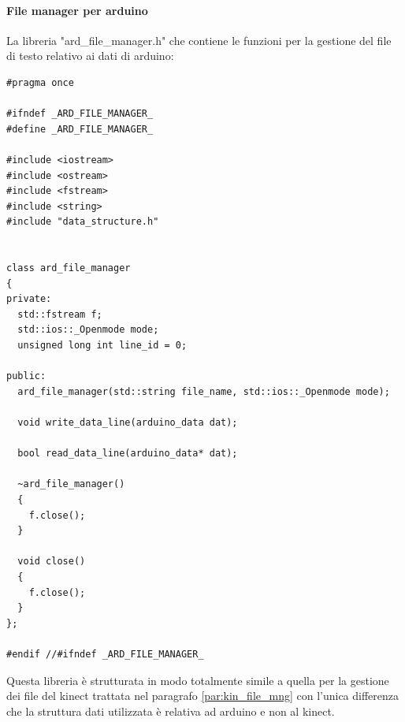 \documentclass[10pt,a4paper]{article}
\begin{document}
\paragraph{File manager per arduino}
La libreria "ard\_file\_manager.h" che contiene le funzioni per la gestione del file di testo relativo ai dati di arduino:
\begin{lstlisting}[style=mycpp, caption=librerie usate, captionpos=b]
#pragma once

#ifndef _ARD_FILE_MANAGER_
#define _ARD_FILE_MANAGER_

#include <iostream>
#include <ostream>
#include <fstream>
#include <string>
#include "data_structure.h"


class ard_file_manager
{
private:
  std::fstream f;
  std::ios::_Openmode mode;
  unsigned long int line_id = 0;

public:
  ard_file_manager(std::string file_name, std::ios::_Openmode mode);

  void write_data_line(arduino_data dat);

  bool read_data_line(arduino_data* dat);

  ~ard_file_manager()
  {
    f.close();
  }

  void close()
  {
    f.close();
  }
};

#endif //#ifndef _ARD_FILE_MANAGER_
\end{lstlisting}
Questa libreria \`e strutturata in modo totalmente simile a quella per la gestione dei file del kinect trattata nel paragrafo \ref{par:kin_file_mng} con l'unica differenza che la struttura dati utilizzata \`e relativa ad arduino e non al kinect.
\\
%
%
\end{document}
